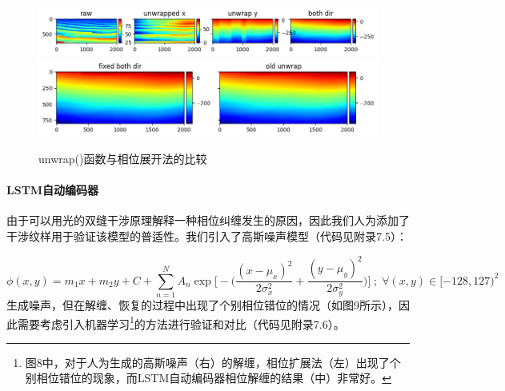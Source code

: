 \documentclass[a4paper]{article}
\begin{document}
	\begin{figure}[H]
		\centering
		\includegraphics[width=1\textwidth]{t1/inside_unwrap_1.png}
		\includegraphics[width=1\textwidth]{t1/inside_unwrap_2.png}
		\caption{unwrap()函数与相位展开法的比较}
		\label{fig:inside_unwrap}
	\end{figure}

	\paragraph{LSTM自动编码器}
	由于可以用光的双缝干涉原理解释一种相位纠缠发生的原因，因此我们人为添加了干涉纹样用于验证该模型的普适性。我们引入了高斯噪声模型（代码见附录7.5）：\par
	\begin{equation}
		\phi(x, y) = m_1 x + m_2 y + C + \sum_{n=1}^{N} A_n \exp \Bigg[ - \bigg( \frac{(x - \mu_x)^2}{2\sigma_x^2} + \frac{(y - \mu_y)^2}{2\sigma_y^2} \bigg) \Bigg] \; ; \; \forall (x, y) \in [-128, 127)^2
	\end{equation}
	生成噪声，但在解缠、恢复的过程中出现了个别相位错位的情况（如图9所示），因此需要考虑引入机器学习\footnote{图8中，对于人为生成的高斯噪声（右）的解缠，相位扩展法（左）出现了个别相位错位的现象，而LSTM自动编码器相位解缠的结果（中）非常好。}的方法进行验证和对比（代码见附录7.6）。\par
\end{document}
